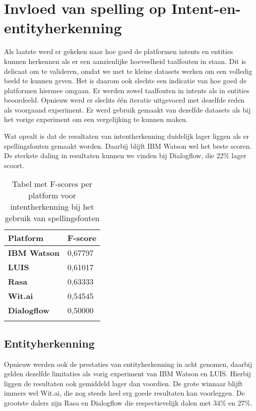 \section{Invloed van spelling op Intent-en-entityherkenning}

Als laatste werd er gekeken naar hoe goed de platformen intents en entities kunnen herkennen als er een aanzienlijke hoeveelheid taalfouten in staan. Dit is delicaat om te valideren, omdat we met te kleine datasets werken om een volledig beeld te kunnen geven. Het is daarom ook slechts een indicatie van hoe goed de platformen hiermee omgaan. Er werden zowel taalfouten in intents als in entities beoordeeld. Opnieuw werd er slechts één iteratie uitgevoerd met dezelfde reden als voorgaand experiment. Er werd gebruik gemaakt van dezelfde datasets als bij het vorige experiment om een vergelijking te kunnen maken.

Wat opvalt is dat de resultaten van intentherkenning duidelijk lager liggen als er spellingsfouten gemaakt worden. Daarbij blijft IBM Watson wel het beste scoren. De sterkste daling in resultaten kunnen we vinden bij Dialogflow, die 22\% lager scoort.

\begin{center}
    \begin{longtable}{| l | l |}
        \hline
        \textbf{Platform} & \textbf{F-score} \\ \hline
        \textbf{IBM Watson} & 0,67797 \\ \hline  
        \textbf{LUIS} & 0,61017 \\ \hline  
        \textbf{Rasa} & 0,63333 \\ \hline  
        \textbf{Wit.ai} & 0,54545  \\ \hline  
        \textbf{Dialogflow} & 0,50000 \\ \hline  
        \caption{Tabel met F-scores per platform voor intentherkenning bij het gebruik van spellingsfouten}                                    
    \end{longtable}
    \label{tbl:results-intent-spelling}
\end{center}

\subsection{Entityherkenning}

Opnieuw werden ook de prestaties van entityherkenning in acht genomen, daarbij gelden dezelfde limitaties als vorig experiment van IBM Watson en LUIS. Hierbij liggen de resultaten ook gemiddeld lager dan voordien. De grote winnaar blijft immers wel Wit.ai, die nog steeds heel erg goede resultaten kan voorleggen. De grootste dalers zijn Rasa en Dialogflow die respectievelijk dalen met 34\% en 27\%.

